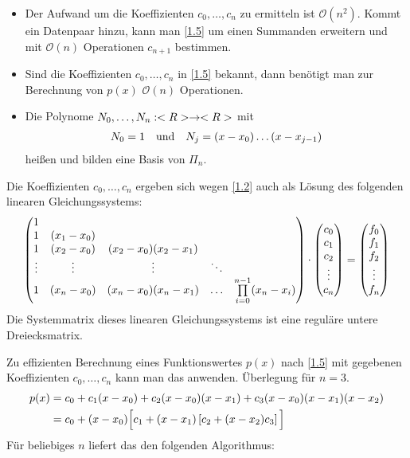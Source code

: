 \begin{remark}
	\begin{itemize}
		\item Der Aufwand um die Koeffizienten $c_0,\dots,c_n$ zu ermitteln ist $\mathcal{O}(n^2)$. Kommt ein Datenpaar hinzu, kann man \cref{1.5} um einen Summanden erweitern und mit $\mathcal{O}(n)$ Operationen $c_{n+1}$ bestimmen.
		\item Sind die Koeffizienten $c_0,\dots,c_n$ in \cref{1.5} bekannt, dann benötigt man zur Berechnung von $p(x)$ $\mathcal{O}(n)$ Operationen.
		\item Die Polynome $N_0,\dots,N_n:<R>\to<R>$ mit 
		\begin{align}
			N_0 = 1\quad\text{und}\quad N_j=(x-x_0)\dots(x-x_{j-1})\notag
		\end{align}
	heißen  und bilden eine Basis von $\Pi_n$.
	\end{itemize}
\end{remark}

Die Koeffizienten $c_0,\dots,c_n$ ergeben sich wegen \cref{1.2} auch als Lösung des folgenden linearen Gleichungssystems:
\begin{align}
	\begin{pmatrix}
		1 & & & & \\
		1 & (x_1-x_0) & & & \\
		1 & (x_2-x_0) & (x_2-x_0)(x_2-x_1) & & \\
		\vdots & \vdots & \vdots & \ddots & \\
		1 & (x_n-x_0) & (x_n-x_0)(x_n-x_1) & \dots & \prod\limits_{i=0}^{n-1} (x_n-x_i)
	\end{pmatrix}\cdot
	\begin{pmatrix}
		c_0 \\ c_1 \\ c_2 \\ \vdots \\ c_n
	\end{pmatrix} = 
	\begin{pmatrix}
	f_0 \\ f_1 \\ f_2 \\ \vdots \\ f_n
	\end{pmatrix}\notag
\end{align}
Die Systemmatrix dieses linearen Gleichungssystems ist eine reguläre untere Dreiecksmatrix.

Zu effizienten Berechnung eines Funktionswertes $p(x)$ nach \cref{1.5} mit gegebenen Koeffizienten $c_0,\dots,c_n$ kann man das  anwenden. Überlegung für $n=3$.
\begin{align}
	p(x) &= c_0 + c_1(x-x_0) + c_2(x-x_0)(x-x_1) + c_3(x-x_0)(x-x_1)(x-x_2) \notag \\
	&= c_0 + (x-x_0)\Big[ c_1 + (x-x_1)\left[ c_2 + (x-x_2)c_3\right]\Big]\notag
\end{align}
Für beliebiges $n$ liefert das den folgenden Algorithmus:

